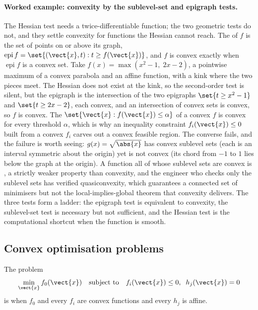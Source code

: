 \paragraph{Worked example: convexity by the sublevel-set and
epigraph tests.}
The Hessian test needs a twice-differentiable function; the two
geometric tests do not, and they settle convexity for functions the
Hessian cannot reach. The  of $f$ is the set of
points on or above its graph, $\operatorname{epi} f = \set{(\vect{x},
t) : t \geq f(\vect{x})}$, and $f$ is convex exactly when
$\operatorname{epi} f$ is a convex set.
Take $f(x) = \max(x^{2} - 1, \; 2x - 2)$, a pointwise maximum of a
convex parabola and an affine function, with a kink where the two
pieces meet. The Hessian does not exist at the kink, so the
second-order test is silent, but the epigraph is the intersection of
the two epigraphs $\set{t \geq x^{2} - 1}$ and $\set{t \geq 2x - 2}$,
each convex, and an intersection of convex sets is convex, so $f$ is
convex. The  $\set{\vect{x} : f(\vect{x}) \leq
\alpha}$ of a convex $f$ is convex for every threshold $\alpha$, which
is why an inequality constraint $f_{i}(\vect{x}) \leq 0$ built from a
convex $f_{i}$ carves out a convex feasible region. The converse
fails, and the failure is worth seeing: $g(x) = \sqrt{\abs{x}}$ has
convex sublevel sets (each is an interval symmetric about the origin)
yet is not convex (its chord from $-1$ to $1$ lies below the graph at
the origin). A function all of whose sublevel sets are convex is
, a strictly weaker property than convexity, and
the engineer who checks only the sublevel sets has verified
quasiconvexity, which guarantees a connected set of minimisers but not
the local-implies-global theorem that convexity delivers. The three
tests form a ladder: the epigraph test is equivalent to convexity, the
sublevel-set test is necessary but not sufficient, and the Hessian
test is the computational shortcut when the function is smooth.

\subsection{Convex optimisation problems}

\begin{definition}
The problem
\[
\min_{\vect{x}} f_{0}(\vect{x}) \quad \text{subject to} \quad
f_{i}(\vect{x}) \leq 0, \;\; h_{j}(\vect{x}) = 0
\]
is  when $f_{0}$ and every $f_{i}$ are convex
functions and every $h_{j}$ is affine.
\end{definition}

